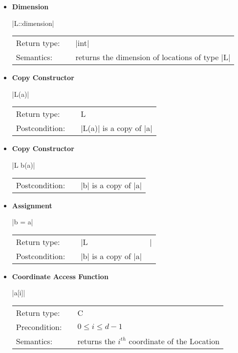 \documentclass[12pt,twoside]{report}
\begin{document}
\begin{itemize}

\item {\bf Dimension}

  |L::dimension|

  \begin{tabular}[!h]{l p{1cm} p{10cm}}
    Return type: & & |int|\\
    Semantics: & & returns the dimension of locations of type |L|\\
  \end{tabular}


\item {\bf Copy Constructor}

  |L(a)|

  \begin{tabular}[!h]{l p{1cm} p{10cm}}
    Return type: & & L\\
    Postcondition: & & |L(a)| is a copy of |a|\\
  \end{tabular}

\item {\bf Copy Constructor}

  |L b(a)|

  \begin{tabular}[!h]{l p{1cm} p{10cm}}
    Postcondition: & & |b| is a copy of |a|\\
  \end{tabular}

\item {\bf Assignment}

  |b = a|

  \begin{tabular}[!h]{l p{1cm} p{10cm}}
    Return type: & & |L&|\\
    Postcondition: & & |b| is a copy of |a|\\
  \end{tabular}



\item {\bf Coordinate Access Function}

  |a[i]|

  \begin{tabular}[!h]{l p{1cm} p{10cm}}
    Return type: & & C\\
    Precondition: & & \mbox{$0 \le i \le d-1$}\\
    Semantics: & & returns the $i^{th}$ coordinate of the Location\\
  \end{tabular}



\end{itemize}
\end{document}
